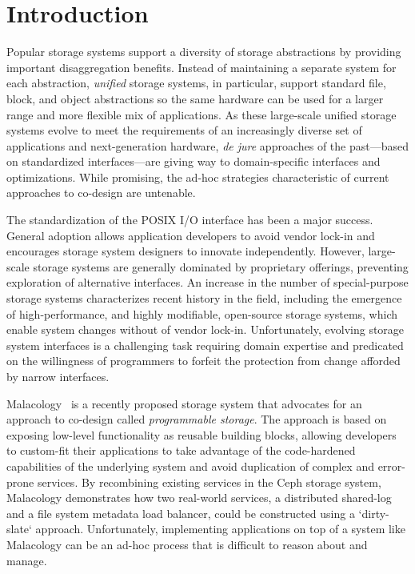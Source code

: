 \section{Introduction}
\label{sec:intro}

Popular storage systems support a diversity of storage abstractions by
providing important disaggregation benefits. Instead of maintaining
a separate system for each abstraction, \emph{unified} storage
systems, in particular, support standard file, block, and object abstractions so the same
hardware can be used for a larger range and more flexible mix of applications. 
As these large-scale unified storage systems evolve to meet the requirements 
of an increasingly diverse set of applications and next-generation hardware, \emph{de jure}
approaches of the past---based on standardized interfaces---are giving way to
domain-specific interfaces and optimizations. While promising, the ad-hoc strategies characteristic of 
current approaches to co-design are untenable.

The standardization of the POSIX I/O interface has been a major success. General adoption
allows application developers to avoid vendor lock-in and encourages storage system
designers to innovate independently. However, large-scale storage systems are generally dominated 
by proprietary offerings, preventing exploration of alternative
interfaces. An increase in the number of special-purpose storage systems characterizes recent history
in the field, including the emergence of high-performance, and highly modifiable, open-source storage systems, 
which enable system changes without of vendor lock-in. Unfortunately, evolving storage system
interfaces is a challenging task requiring domain expertise and predicated on the willingness of
programmers to forfeit the protection from change afforded by narrow
interfaces.

Malacology~\cite{sevilla:eurosys17} is a recently proposed storage system that
advocates for an approach to co-design called \emph{programmable storage}. The
approach is based on exposing low-level functionality as reusable building
blocks, allowing developers to custom-fit their applications to take advantage
of the code-hardened capabilities of the underlying system and avoid
duplication of complex and error-prone services. By recombining existing
services in the Ceph storage system, Malacology demonstrates how two
real-world services, a distributed shared-log and a file system metadata load
balancer, could be constructed using a `dirty-slate` approach. Unfortunately, implementing
applications on top of a system like Malacology can be an ad-hoc process
that is difficult to reason about and manage.

